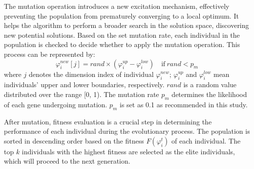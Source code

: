 \documentclass[journal,twoside]{IEEEtran}
\begin{document}
The mutation operation introduces a new excitation mechanism, effectively preventing the population from prematurely converging to a local optimum. It helps the algorithm to perform a broader search in the solution space, discovering new potential solutions. Based on the set mutation rate, each individual in the population is checked to decide whether to apply the mutation operation. This process can be represented by:
\begin{equation}\label{E17}
	\varphi^{new}_i[j] = rand \times (\varphi^{up}_i-\varphi^{low}_i) \quad \text{if} \ rand < p_m  
\end{equation}
where $j$ denotes the dimension index of individual $\varphi^{new}_i$; $\varphi^{up}_i$ and $\varphi^{low}_i$ mean individuals' upper and lower boundaries, respectively. $rand$ is a random value distributed over the range [0, 1). The mutation rate $p_m$ determines the likelihood of each gene undergoing mutation. $p_m$ is set as 0.1 as recommended in this study.

After mutation, fitness evaluation is a crucial step in determining the performance of each individual during the evolutionary process. The population is sorted in descending order based on the fitness $F\left(\varphi_i^t\right)$ of each individual. The top $k$ individuals with the highest fitness are selected as the elite individuals, which will proceed to the next generation.
\end{document}
